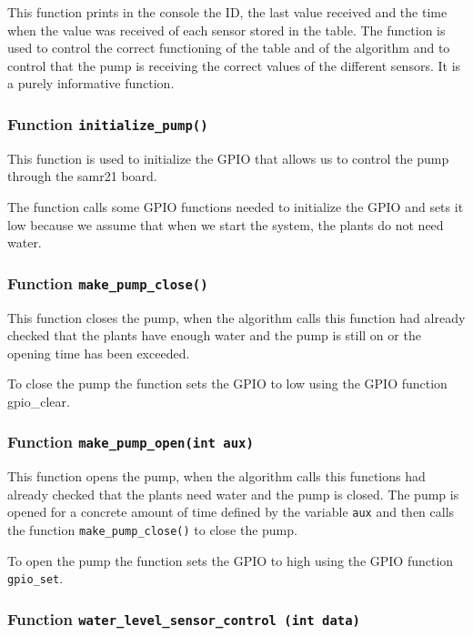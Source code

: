 \documentclass[11pt,paper=a4,parskip=half]{scrartcl}
\begin{document}
This function prints in the console the ID, the last value received and the
time when the value was received of each sensor stored in the table.
The function is used to control the correct functioning of the table and of the
algorithm and to control that the pump is receiving the correct values of the
different sensors.
It is a purely informative function.

\subsubsection{Function \texttt{initialize\_pump()}}

This function is used to initialize the GPIO that allows us to control the pump
through the samr21 board.

The function calls some GPIO functions needed to initialize the GPIO and sets
it low because we assume that when we start the system, the plants do not need
water.

\subsubsection{Function \texttt{make\_pump\_close()}}

This function closes the pump, when the algorithm calls this function had
already checked that the plants have enough water and the pump is still on or
the opening time has been exceeded.

To close the pump the function sets the GPIO to low using the GPIO function
gpio\_clear.

\subsubsection{Function \texttt{make\_pump\_open(int aux)}}

This function opens the pump, when the algorithm calls this functions had
already checked that the plants need water and the pump is closed. The pump is
opened for a concrete amount of time defined by the variable \verb`aux` and then calls
the function \texttt{make\_pump\_close()} to close the pump.

To open the pump the function sets the GPIO to high using the GPIO function
\texttt{gpio\_set}.

\subsubsection{Function \texttt{water\_level\_sensor\_control (int data)}}
\end{document}
